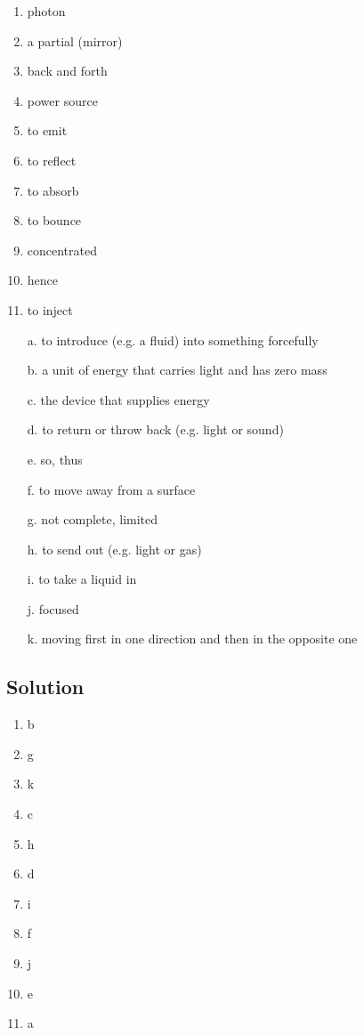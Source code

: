 \begin{enumerate}
      \item photon
      \item a partial (mirror)
      \item back and forth
      \item power source
      \item to emit
      \item to reflect
      \item to absorb
      \item to bounce
      \item concentrated
      \item hence
      \item to inject \\
\end{enumerate}

\begin{enumerate}
      \item[a.] to introduce (e.g. a fluid) into something forcefully
      \item[b.] a unit of energy that carries light and has zero mass
      \item[c.] the device that supplies energy
      \item[d.] to return or throw back (e.g. light or sound)
      \item[e.] so, thus
      \item[f.] to move away from a surface
      \item[g.] not complete, limited
      \item[h.] to send out (e.g. light or gas)
      \item[i.] to take a liquid in
      \item[j.] focused
      \item[k.] moving first in one direction and then in the opposite one
\end{enumerate}

\subsection*{Solution}
\begin{enumerate}
      \item b
      \item g
      \item k
      \item c
      \item h
      \item d
      \item i
      \item f
      \item j
      \item e
      \item a
\end{enumerate}

